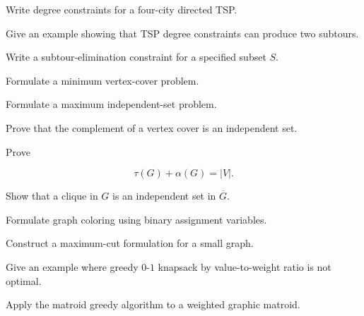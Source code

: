 \begin{exercise}[3]
Write degree constraints for a four-city directed TSP.
\end{exercise}

\begin{exercise}[3]
Give an example showing that TSP degree constraints can produce two
subtours.
\end{exercise}

\begin{exercise}[3]
Write a subtour-elimination constraint for a specified subset \(S\).
\end{exercise}

\begin{exercise}[3]
Formulate a minimum vertex-cover problem.
\end{exercise}

\begin{exercise}[3]
Formulate a maximum independent-set problem.
\end{exercise}

\begin{exercise}[3]
Prove that the complement of a vertex cover is an independent set.
\end{exercise}

\begin{exercise}[3]
Prove

\[
\tau(G)+\alpha(G)=|V|.
\]
\end{exercise}

\begin{exercise}[3]
Show that a clique in \(G\) is an independent set in \(\overline{G}\).
\end{exercise}

\begin{exercise}[3]
Formulate graph coloring using binary assignment variables.
\end{exercise}

\begin{exercise}[3]
Construct a maximum-cut formulation for a small graph.
\end{exercise}

\begin{exercise}[3]
Give an example where greedy \(0\)-\(1\) knapsack by value-to-weight ratio
is not optimal.
\end{exercise}

\begin{exercise}[3]
Apply the matroid greedy algorithm to a weighted graphic matroid.
\end{exercise}

